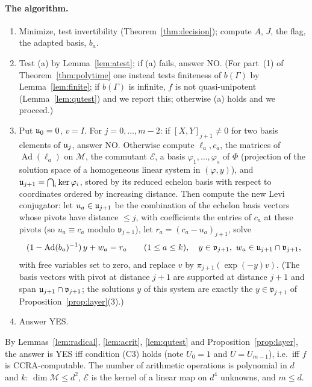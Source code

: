 \paragraph{The algorithm.}
\begin{enumerate}
\item Minimize, test invertibility (Theorem~\ref{thm:decision}); compute $A$, $J$, the flag, the
adapted basis, $b_a$.
\item Test (a) by Lemma~\ref{lem:atest}; if (a) fails, answer NO. (For part~(1) of
Theorem~\ref{thm:polytime} one instead tests finiteness of $b(\Gamma)$ by Lemma~\ref{lem:finite}; if
$b(\Gamma)$ is infinite, $f$ is not quasi-unipotent (Lemma~\ref{lem:qutest}) and we report this; otherwise
(a) holds and we proceed.)
\item Put $\mathfrak{u}_0=0$, $v=I$. For $j=0,\ldots,m-2$: if $[X,Y]_{j+1}\ne0$ for two basis elements of
$\mathfrak{u}_j$, answer NO. Otherwise compute $\ell_a,c_a$, the matrices of $\operatorname{Ad}(\ell_a)$ on
$\mathcal M$, the commutant $\mathcal E$, a basis $\varphi_1,\ldots,\varphi_s$ of $\Phi$ (projection of
the solution space of a homogeneous linear system in $(\varphi,y)$), and
$\mathfrak{u}_{j+1}=\bigcap_i\ker\varphi_i$, stored by its reduced echelon basis with respect to coordinates
ordered by increasing distance. Then compute the new Levi conjugator: let $u_a\in\mathfrak{u}_{j+1}$ be the
combination of the echelon basis vectors whose pivots have distance $\le j$, with coefficients the
entries of $c_a$ at these pivots (so $u_a\equiv c_a$ modulo $\mathfrak v_{j+1}$), let
$r_a=(c_a-u_a)_{j+1}$, solve
\[
(1-\operatorname{Ad}(b_a)^{-1})\,y+w_a=r_a\qquad(1\le a\le k),\quad y\in\mathfrak v_{j+1},\
w_a\in\mathfrak{u}_{j+1}\cap\mathfrak v_{j+1},
\]
with free variables set to zero, and replace $v$ by $\pi_{j+1}(\exp(-y)v)$. (The basis vectors with pivot
at distance $j+1$ are supported at distance $j+1$ and span $\mathfrak{u}_{j+1}\cap\mathfrak v_{j+1}$; the solutions
$y$ of this system are exactly the $y\in\mathfrak v_{j+1}$ of Proposition~\ref{prop:layer}(3).)
\item Answer YES.
\end{enumerate}
By Lemmas~\ref{lem:radical}, \ref{lem:acrit}, \ref{lem:qutest} and Proposition~\ref{prop:layer}, the
answer is YES iff condition (C3) holds (note $U_0=1$ and $U=U_{m-1}$), i.e.\ iff $f$ is
CCRA-computable. The number of arithmetic operations is polynomial in $d$ and $k$:
$\dim\mathcal M\le d^2$, $\mathcal E$ is the kernel of a linear map on $d^4$ unknowns, and $m\le d$.

